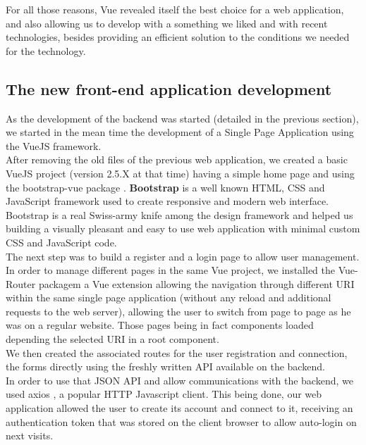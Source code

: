 \documentclass{eplmastersthesis}
\begin{document}
        For all those reasons, Vue revealed itself the best choice for a
        web application, and also allowing us to develop with a something
        we liked and with recent technologies, besides providing an efficient
        solution to the conditions we needed for the technology.

      \subsection{The new front-end application development}

        As the development of the backend was started (detailed in the
        previous section), we started in the mean time the development of a
        Single Page Application using the VueJS framework.\\

        After removing the old files of the previous web application, we
        created a basic VueJS project (version 2.5.X at that time) having a
        simple home page and using the bootstrap-vue package
        \cite{BootstrapVue}. \textbf{Bootstrap} \cite{Bootstrap} is a well
        known HTML, CSS and JavaScript framework used to create responsive
        and modern web interface.\\
        Bootstrap is a real Swiss-army knife among the design framework
        and helped us building a visually pleasant and easy to use
        web application with minimal custom CSS and JavaScript code.\\

        The next step was to build a register and a login page to allow
        user management. In order to manage different pages in the same Vue
        project, we installed the Vue-Router packagem a Vue extension
        allowing the navigation through different URI within the same
        single page application (without any reload and additional requests
        to the web server), allowing the user to switch from page to page
        as he was on a regular website. Those pages being in fact components
        loaded depending the selected URI in a root component.\\
        We then created the associated routes for the user registration and
        connection, the forms directly using the freshly written API available
        on the backend.\\
        In order to use that JSON API and allow communications with the
        backend, we used axios \cite{axios}, a popular HTTP Javascript client.
        This being done, our web application allowed the user to create its
        account and connect to it, receiving an authentication token that
        was stored on the client browser to allow auto-login on next visits.\\
\end{document}
